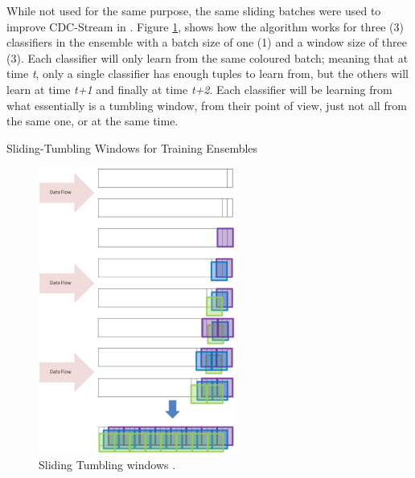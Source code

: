 \documentclass[runningheads]{llncs}
\begin{document}
While not used for the same purpose, the same sliding batches were used to improve CDC-Stream in \citep{d2017context}. Figure \ref{fig:sliding_tumbling_windows}, shows how the algorithm works for three (3) classifiers in the ensemble with a batch size of one (1) and a window size of three (3). Each classifier will only learn from the same coloured batch; meaning that at time \textit{t}, only a single classifier has enough tuples to learn from, but the others will learn at time \textit{t+1} and finally at time \textit{t+2}. Each classifier will be learning from what essentially is a tumbling window, from their point of view, just not all from the same one, or at the same time. 


\begin{algorithm}
\caption{Sliding-Tumbling Windows for Training Ensembles\label{alg:sliding_tumbling_windows} }
\end{algorithm}


\begin{figure}
\begin{center}
 \includegraphics[width=6.5cm]{./images/chapter3/sliding_tumbling_windows}
 \caption{Sliding Tumbling windows \citep{d2017context}.}
 \label{fig:sliding_tumbling_windows}
 \end{center}
\end{figure}
\end{document}

